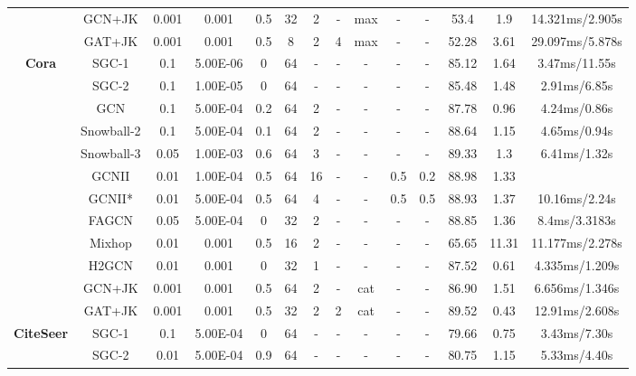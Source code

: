\documentclass{article}
\newcommand{\0}{{\boldsymbol{0}}}
\newcommand{\6}{{\partial}}
\newcommand{\8}{{\infty}}
\newcommand{\4}{{\nabla}}
\begin{document}
\begin{table}[htbp]
{\begin{tabular}{c|c|cccccccccccc}
          & GCN+JK & 0.001 & 0.001 & 0.5   & 32    & 2     & - & {max} & - & - & 53.4  & 1.9   & {14.321ms/2.905s} \\
          &  GAT+JK & 0.001 & 0.001 & 0.5   & 8     & 2     & 4     & {max} & - & - & 52.28 & 3.61  & {29.097ms/5.878s} \\
          \midrule
    \multirow{12}[1]{*}{\textbf{Cora}} & SGC-1 & 0.1   & 5.00E-06 & 0     & 64    & -     & -     & -     & -     & -     & 85.12 & 1.64  & 3.47ms/11.55s \\
          & SGC-2 & 0.1   & 1.00E-05 & 0     & 64    & -     & -     & -     & -     & -     & 85.48 & 1.48  & 2.91ms/6.85s \\
          & GCN   & 0.1   & 5.00E-04 & 0.2   & 64    & 2     & -     & -     & -     & -     & 87.78 & 0.96  & 4.24ms/0.86s \\
          & Snowball-2 & 0.1   & 5.00E-04 & 0.1   & 64    & 2     & -     & -     & -     & -     & 88.64 & 1.15  & 4.65ms/0.94s \\
          & Snowball-3 & 0.05  & 1.00E-03 & 0.6   & 64    & 3     & -     & -     & -     & -     & 89.33 & 1.3   & 6.41ms/1.32s \\
          & GCNII & 0.01  & 1.00E-04 & 0.5   & 64    & 16    & -     & -     & 0.5   & 0.2   & 88.98 & 1.33  &  \\
          & GCNII* & 0.01  & 5.00E-04 & 0.5   & 64    & 4     & -     & -     & 0.5   & 0.5   & 88.93 & 1.37  & 10.16ms/2.24s \\
          & FAGCN & 0.05  & 5.00E-04 & 0     & 32    & 2     & -     & -     & -     & -     & 88.85 & 1.36  & 8.4ms/3.3183s \\
          &  Mixhop & 0.01  & 0.001 & 0.5   & 16    & 2     & - & - & - & - & 65.65 & 11.31 & {11.177ms/2.278s} \\
          & H2GCN & 0.01  & 0.001 & 0     & 32    & 1     & - & - & - & - & 87.52 & 0.61  & {4.335ms/1.209s} \\
          & GCN+JK & 0.001 & 0.001 & 0.5   & 64    & 2     & - & {cat} & - & - & 86.90 & 1.51  & {6.656ms/1.346s} \\
          &  GAT+JK & 0.001 & 0.001 & 0.5   & 32    & 2     & 2     & {cat} & - & - & 89.52 & 0.43  & {12.91ms/2.608s} \\
    \midrule
    \multirow{12}[1]{*}{\textbf{CiteSeer}} & SGC-1 & 0.1   & 5.00E-04 & 0     & 64    & -     & -     & -     & -     & -     & 79.66 & 0.75  & 3.43ms/7.30s \\
          & SGC-2 & 0.01  & 5.00E-04 & 0.9   & 64    & -     & -     & -     & -     & -     & 80.75 & 1.15  & 5.33ms/4.40s \\

\end{tabular}}
\end{table}
\end{document}
